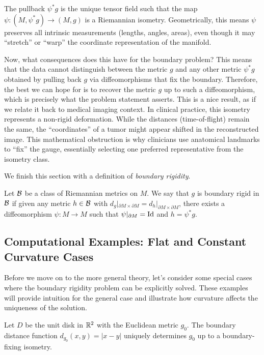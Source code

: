 \begin{note}
  The pullback $\psi^*g$ is the unique tensor field such that the map $\psi: (M, \psi^*g) \to (M, g)$ is a Riemannian isometry. Geometrically, this means $\psi$ preserves all intrinsic measurements (lengths, angles, areas), even though it may ``stretch'' or ``warp'' the coordinate representation of the manifold.
\end{note}

Now, what consequences does this have for the boundary problem? This means that the data cannot distinguish between the metric $g$ and any other metric $\psi^*g$ obtained by pulling back $g$ via diffeomorphisms that fix the boundary. Therefore, the best we can hope for is to recover the metric $g$ up to such a diffeomorphism, which is precisely what the problem statement asserts. This is a nice result, as if we relate it back to medical imaging context. In clinical practice, this isometry represents a non-rigid deformation. While the distances (time-of-flight) remain the same, the ``coordinates'' of a tumor might appear shifted in the reconstructed image. This mathematical obstruction is why clinicians use anatomical landmarks to ``fix'' the gauge, essentially selecting one preferred representative from the isometry class.

We finish this section with a definition of \emph{boundary rigidity}.
\begin{definition}
  Let $\mathcal{B}$ be a class of Riemannian metrics on $M$. We say that $g$ is boundary rigid in $\mathcal{B}$ if given any metric $h \in \mathcal{B}$ with $d_g|_{\partial M \times \partial M} = d_h|_{\partial M \times \partial M}$, there exists a diffeomorphism $\psi : M \to M$ such that $\psi|_{\partial M} = \operatorname{Id}$ and $h = \psi^*g$.
\end{definition}

\subsection{Computational Examples: Flat and Constant Curvature Cases}
\label{sub_sec:examples}

Before we move on to the more general theory, let's consider some special cases where the boundary rigidity problem can be explicitly solved. These examples will provide intuition for the general case and illustrate how curvature affects the uniqueness of the solution.
\begin{proposition}
  Let $D$ be the unit disk in $\mathbb{R}^2$ with the Euclidean metric $g_0$. The boundary distance function $d_{g_0}(x, y) = |x - y|$ uniquely determines $g_0$ up to a boundary-fixing isometry.
\end{proposition}

